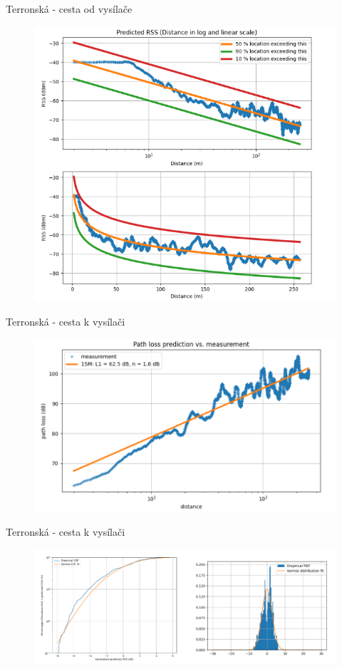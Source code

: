 \documentclass[aspectratio=169, 12pt, hyperref={unicode}]{beamer}
\begin{document}
\begin{frame}{Terronská - cesta od vysílače}
	\begin{figure}[!ht]
		\centering
		\includegraphics[width=.5\textwidth]{src/terronska-od-vysilace-3.png}
	\end{figure}
\end{frame}
\begin{frame}{Terronská - cesta k vysílači}
	\begin{figure}[!ht]
		\centering
		\includegraphics[width=.75\textwidth]{src/terronska-k-vysilaci-1.png}
	\end{figure}
\end{frame}
\begin{frame}{Terronská - cesta k vysílači}
	\begin{figure}[!ht]
		\centering
		\includegraphics[width=.9\textwidth]{src/terronska-k-vysilaci-2.png}
	\end{figure}
\end{frame}
\end{document}
